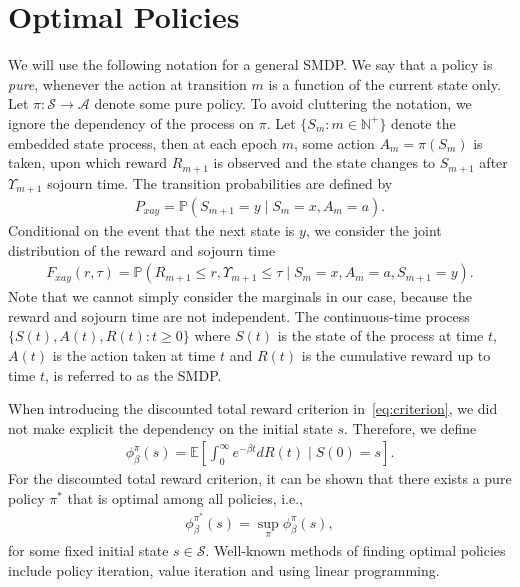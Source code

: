 \documentclass{article}
\theoremstyle{definition}
\theoremstyle{plain}
\begin{document}
\section{Optimal Policies}

We will use the following notation for a general SMDP. We say that a policy is
\textit{pure}, whenever the action at transition $m$ is a function of the
current state only. Let $\pi : \mathcal{S} \rightarrow \mathcal{A}$ denote some
pure policy. To avoid cluttering the notation, we ignore the dependency of the
process on $\pi$. Let $\{ S_{m} : m \in \mathbb{N}^{+} \}$ denote the embedded
state process, then at each epoch $m$, some action $A_{m} = \pi(S_{m})$ is
taken, upon which reward $R_{m+1}$ is observed and the state changes to
$S_{m+1}$ after $\Upsilon_{m+1}$ sojourn time. The transition probabilities are
defined by
\begin{align}
  P_{xay} = \mathbb{P}(S_{m+1} = y \; | \; S_{m} = x, A_{m} = a) .
\end{align}
Conditional on the event that the next state is $y$, we consider the joint
distribution of the reward and sojourn time
\begin{align}
  F_{xay}(r, \tau) = \mathbb{P}(R_{m+1} \leq r, \Upsilon_{m+1} \leq \tau \; | \; S_{m} = x, A_{m} = a, S_{m+1} = y ) .
\end{align}
Note that we cannot simply consider the marginals in our case, because the
reward and sojourn time are not independent. The continuous-time process
$\{ S(t), A(t), R(t) : t \geq 0 \}$ where $S(t)$ is the state of the process at
time $t$, $A(t)$ is the action taken at time $t$ and $R(t)$ is the cumulative
reward up to time $t$, is referred to as the SMDP.

When introducing the discounted total reward criterion in~\eqref{eq:criterion},
we did not make explicit the dependency on the initial state $s$. Therefore, we
define
\begin{align}
  \phi_{\beta}^{\pi}(s) = \mathbb{E} \left[ \int_{0}^{\infty} e^{- \beta t} dR(t) \; \big| \; S(0) = s \right] .
\end{align}
%
For the discounted total reward criterion,
it can be shown that there exists a pure policy $\pi^{*}$ that is optimal among
all policies, i.e.,
\begin{align}
  \phi_{\beta}^{\pi^{*}}(s) = \sup_{\pi} \phi_{\beta}^{\pi}(s) ,
\end{align}
for some fixed initial state $s \in \mathcal{S}$. Well-known methods of finding
optimal policies include policy iteration, value iteration and using linear
programming.
\end{document}
